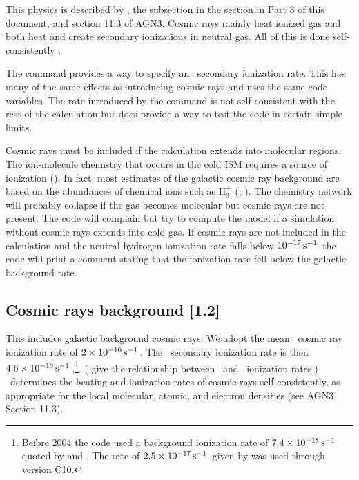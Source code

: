 This physics
is described by \citet{FerlandMushotzky1984},
the subsection  in the section 
 in Part 3 of this
document, and section 11.3 of AGN3.
Cosmic rays mainly heat ionized gas
and both heat and create secondary ionizations in neutral gas.
All of this
is done self-consistently \citep{Dalgarno1999}.

The  command provides a way to
specify an \hO\ secondary ionization rate.
This has many of the same effects
as introducing cosmic rays and uses the same code variables.
The rate
introduced by the  command is not
self-consistent with the rest of the calculation but does
provide a way to test the code in certain simple limits.

Cosmic rays must be included if the calculation extends into molecular
regions.
The ion-molecule chemistry that occurs in the cold ISM requires
a source of ionization (\citealp{Dyson1997}).
In fact, most estimates
of the galactic cosmic ray background are based
on the abundances of chemical
ions such as H$_{3}^{+}$ (\citealp{McCall2003}; \citealp{Shaw2008}).
The chemistry
network will probably collapse if the gas becomes molecular
but cosmic rays
are not present.
The code will complain but try to compute the model if
a simulation without cosmic rays extends into cold gas.
If cosmic rays
are not included in the calculation and the neutral hydrogen ionization
rate falls below $10^{-17} \mbox{${\rm\thinspace s}^{-1}\,$}$
the code will print a comment stating that the
ionization rate fell below the galactic background rate.

\subsection{Cosmic rays background [1.2]}

This includes galactic background cosmic rays.
We adopt the \citet{Indriolo2007} mean \hO\ cosmic ray ionization rate 
of $2\times 10^{-16} \mbox{${\rm\thinspace s}^{-1}\,$}$.
The \htwo\ secondary ionization
rate is then $4.6\times 10^{-16} \mbox{${\rm\thinspace s}^{-1}\,$}$,\footnote{Before 2004 the code used a
background ionization rate of $7.4\times 10^{-18} \mbox{${\rm\thinspace s}^{-1}\,$}$
quoted by \citet[Table 10]{Tielens1985a}
and \citet{McKee1999}.
The rate of $2.5\times 10^{-17} \mbox{${\rm\thinspace s}^{-1}\,$}$ given by \citet{Williams1998} was used through
version C10.}.
(\citet{Glassgold.A74Model-calculations-for-diffuse-molecular} give the
relationship between \hO\ and \htwo\ ionization rates.)
\Cloudy\ determines the heating and
ionization rates of cosmic rays self consistently,
as appropriate for the
local molecular, atomic, and electron densities
(see AGN3 Section 11.3).

